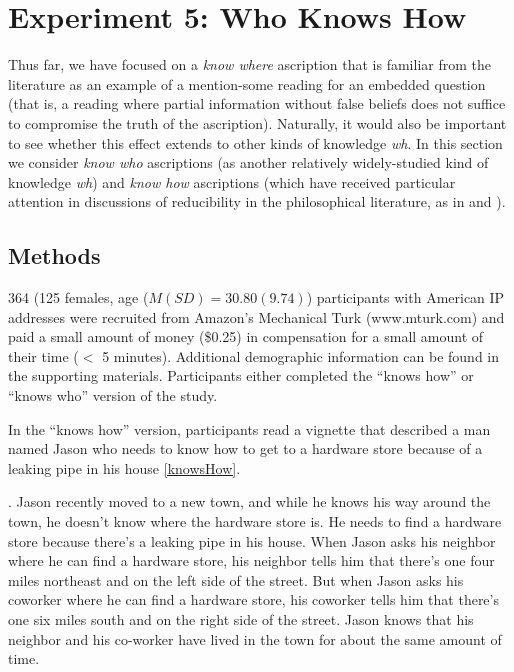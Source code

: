 \documentclass[a4paper]{article}
\begin{document}
\section{Experiment 5: Who Knows How}

Thus far, we have focused on a \textit{know where} ascription that is familiar from the literature as an example of a mention-some reading for an embedded question (that is, a reading where partial information without false beliefs does not suffice to compromise the truth of the ascription). Naturally, it would also be important to see whether this effect extends to other kinds of knowledge \textit{wh}. In this section we consider \textit{know who} ascriptions (as another relatively widely-studied kind of knowledge \textit{wh}) and \textit{know how} ascriptions (which have received particular attention in discussions of reducibility in the philosophical literature, as in \cite{ryle:knowhow} and \cite{stanley:knowhow}).

\subsection{Methods}

364 (125 females, age (${M}({SD}) = 30.80(9.74)$) participants with American IP addresses were recruited from Amazon's Mechanical Turk (www.mturk.com) and paid a small amount of money (\$0.25) in compensation for a small amount of their time ($<$ 5 minutes). Additional demographic information can be found in the supporting materials. Participants either completed the ``knows how'' or ``knows who'' version of the study. 

In the ``knows how'' version, participants read a vignette that described a man named Jason who needs to know how to get to a hardware store because of a leaking pipe in his house \ref{knowsHow}. 

\ex. \label{knowsHow} Jason recently moved to a new town, and while he knows his way around the town, he doesn't know where the hardware store is. He needs to find a hardware store because there's a leaking pipe in his house. When Jason asks his neighbor where he can find a hardware store, his neighbor tells him that there's one four miles northeast and on the left side of the street. But when Jason asks his coworker where he can find a hardware store, his coworker tells him that there's one six miles south and on the right side of the street. Jason knows that his neighbor and his co-worker have lived in the town for about the same amount of time.
\end{document}
